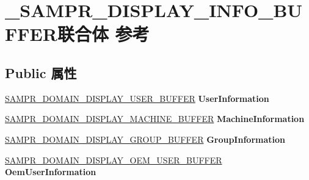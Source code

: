 \hypertarget{union___s_a_m_p_r___d_i_s_p_l_a_y___i_n_f_o___b_u_f_f_e_r}{}\section{\+\_\+\+S\+A\+M\+P\+R\+\_\+\+D\+I\+S\+P\+L\+A\+Y\+\_\+\+I\+N\+F\+O\+\_\+\+B\+U\+F\+F\+E\+R联合体 参考}
\label{union___s_a_m_p_r___d_i_s_p_l_a_y___i_n_f_o___b_u_f_f_e_r}
\subsection*{Public 属性}
\begin{DoxyCompactItemize}
\item 
\mbox{\label{union___s_a_m_p_r___d_i_s_p_l_a_y___i_n_f_o___b_u_f_f_e_r_a8ad89904bcfaf5c873d80a889d05f2cf}} 
\hyperlink{struct___s_a_m_p_r___d_o_m_a_i_n___d_i_s_p_l_a_y___u_s_e_r___b_u_f_f_e_r}{S\+A\+M\+P\+R\+\_\+\+D\+O\+M\+A\+I\+N\+\_\+\+D\+I\+S\+P\+L\+A\+Y\+\_\+\+U\+S\+E\+R\+\_\+\+B\+U\+F\+F\+ER} {\bfseries User\+Information}
\item 
\mbox{\label{union___s_a_m_p_r___d_i_s_p_l_a_y___i_n_f_o___b_u_f_f_e_r_ae80f0bd6c9b6774daf8bc44f8f4739d8}} 
\hyperlink{struct___s_a_m_p_r___d_o_m_a_i_n___d_i_s_p_l_a_y___m_a_c_h_i_n_e___b_u_f_f_e_r}{S\+A\+M\+P\+R\+\_\+\+D\+O\+M\+A\+I\+N\+\_\+\+D\+I\+S\+P\+L\+A\+Y\+\_\+\+M\+A\+C\+H\+I\+N\+E\+\_\+\+B\+U\+F\+F\+ER} {\bfseries Machine\+Information}
\item 
\mbox{\label{union___s_a_m_p_r___d_i_s_p_l_a_y___i_n_f_o___b_u_f_f_e_r_af00ce75e93c10877cb1ba06af1605150}} 
\hyperlink{struct___s_a_m_p_r___d_o_m_a_i_n___d_i_s_p_l_a_y___g_r_o_u_p___b_u_f_f_e_r}{S\+A\+M\+P\+R\+\_\+\+D\+O\+M\+A\+I\+N\+\_\+\+D\+I\+S\+P\+L\+A\+Y\+\_\+\+G\+R\+O\+U\+P\+\_\+\+B\+U\+F\+F\+ER} {\bfseries Group\+Information}
\item 
\mbox{\label{union___s_a_m_p_r___d_i_s_p_l_a_y___i_n_f_o___b_u_f_f_e_r_a8833b4ca3f648f49f5f8738c5637d026}} 
\hyperlink{struct___s_a_m_p_r___d_o_m_a_i_n___d_i_s_p_l_a_y___o_e_m___u_s_e_r___b_u_f_f_e_r}{S\+A\+M\+P\+R\+\_\+\+D\+O\+M\+A\+I\+N\+\_\+\+D\+I\+S\+P\+L\+A\+Y\+\_\+\+O\+E\+M\+\_\+\+U\+S\+E\+R\+\_\+\+B\+U\+F\+F\+ER} {\bfseries Oem\+User\+Information}

\end{DoxyCompactItemize}
